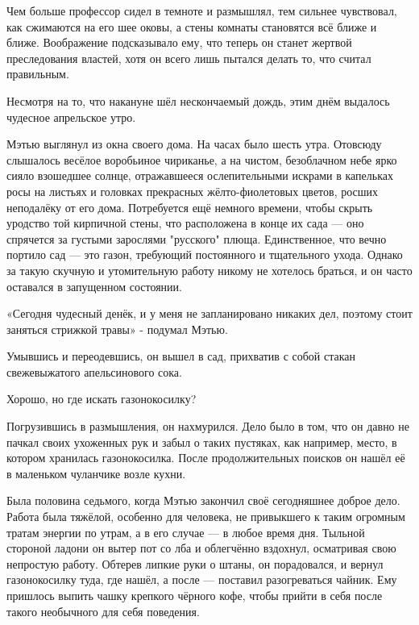 \documentclass[a4paper,12pt]{book}
\begin{document}
\par
Чем больше профессор сидел в темноте и размышлял, тем сильнее чувствовал, как сжимаются на его шее оковы, а стены комнаты становятся всё ближе и ближе. Воображение подсказывало ему, что теперь он станет жертвой преследования властей, хотя он всего лишь пытался делать то, что считал правильным.\\
\par
Несмотря на то, что накануне шёл нескончаемый дождь, этим днём выдалось чудесное апрельское утро.
\par
Мэтью выглянул из окна своего дома. На часах было шесть утра. Отовсюду слышалось весёлое воробьиное чириканье, а на чистом, безоблачном небе ярко сияло взошедшее солнце, отражавшееся ослепительными искрами в капельках росы на листьях и головках прекрасных жёлто-фиолетовых цветов, росших неподалёку от его дома. Потребуется ещё немного времени, чтобы скрыть уродство той кирпичной стены, что расположена в конце их сада — оно спрячется за густыми зарослями "русского" плюща. Единственное, что вечно портило сад — это газон, требующий постоянного и тщательного ухода. Однако за такую скучную и утомительную работу никому не хотелось браться, и он часто оставался в запущенном состоянии.
\par
«Сегодня чудесный денёк, и у меня не запланировано никаких дел, поэтому стоит заняться стрижкой травы» - подумал Мэтью.
\par
Умывшись и переодевшись, он вышел в сад, прихватив с собой стакан свежевыжатого апельсинового сока.
\par
Хорошо, но где искать газонокосилку?
\par
Погрузившись в размышления, он нахмурился. Дело было в том, что он давно не пачкал своих ухоженных рук и забыл о таких пустяках, как например, место, в котором хранилась газонокосилка. После продолжительных поисков он нашёл её в маленьком чуланчике возле кухни.\\
\par
Была половина седьмого, когда Мэтью закончил своё сегодняшнее доброе дело. Работа была тяжёлой, особенно для человека, не привыкшего к таким огромным тратам энергии по утрам, а в его случае — в любое время дня. Тыльной стороной ладони он вытер пот со лба и облегчённо вздохнул, осматривая свою непростую работу. Обтерев липкие руки о штаны, он порадовался, и вернул газонокосилку туда, где нашёл, а после — поставил разогреваться чайник. Ему пришлось выпить чашку крепкого чёрного кофе, чтобы прийти в себя после такого необычного для себя поведения.
\par
\end{document}
